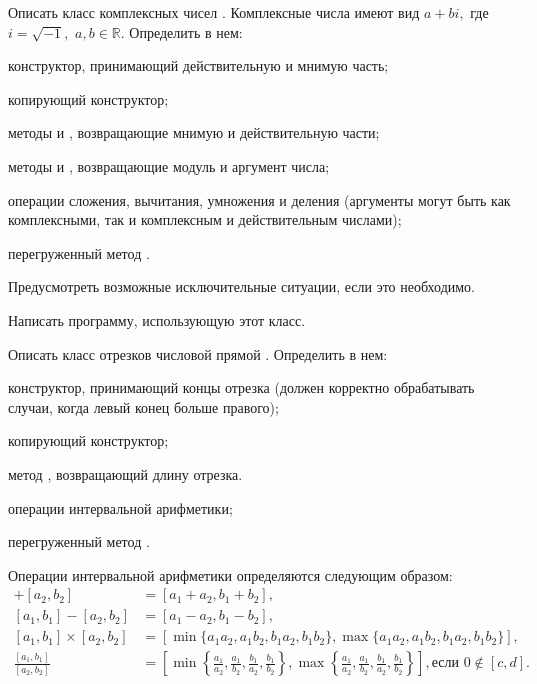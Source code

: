 \task Описать класс комплексных чисел . Комплексные числа
имеют вид $a+bi,$ где $i=\sqrt{-1},$ $a,b \in \mathbb{R}$. Определить
в нем:
\begin{itemize*}
\item конструктор, принимающий действительную и мнимую часть;
\item копирующий конструктор;
\item методы  и , возвращающие мнимую и действительную
  части;
\item методы  и , возвращающие модуль и аргумент
  числа;
\item операции сложения, вычитания, умножения и деления (аргументы
  могут быть как комплексными, так и комплексным и действительным
  числами);
\item перегруженный метод .
\end{itemize*}

Предусмотреть возможные исключительные ситуации, если это необходимо.

Написать программу, использующую этот класс.

\task Описать класс отрезков числовой прямой
. Определить в нем:
\begin{itemize*}
\item конструктор, принимающий концы отрезка (должен корректно
  обрабатывать случаи, когда левый конец больше правого);
\item копирующий конструктор;
\item метод , возвращающий длину отрезка.
\item операции интервальной арифметики;
\item перегруженный метод .
\end{itemize*}

Операции интервальной арифметики определяются следующим образом:
\begin{align*}
  [a_1, b_1] + [a_2, b_2] &= [a_1 + a_2, b_1 + b_2],\\
  [a_1, b_1] - [a_2, b_2] &= [a_1 - a_2, b_1 - b_2],\\
  [a_1, b_1] \times [a_2, b_2] &=
  [\min \{a_1a_2, a_1b_2, b_1a_2, b_1b_2\}, \max \{a_1a_2, a_1b_2, b_1a_2, b_1b_2\}],\\
  \frac{[a_1, b_1]}{[a_2, b_2]} &=
  \left[
    \min \left\{\frac{a_1}{a_2}, \frac{a_1}{b_2}, \frac{b_1}{a_2}, \frac{b_1}{b_2}\right\},
    \max \left\{\frac{a_1}{a_2}, \frac{a_1}{b_2}, \frac{b_1}{a_2}, \frac{b_1}{b_2}\right\}
    \right], \textrm{если } 0\not\in[c, d].
\end{align*}

